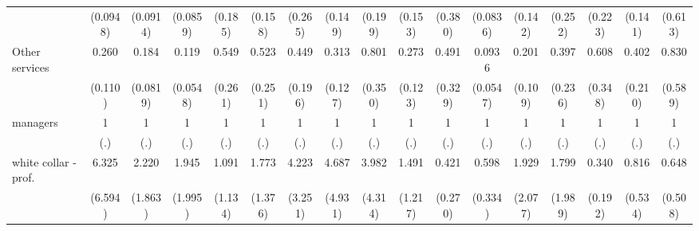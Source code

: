 {\begin{tabular}{l*{16}{c}}
                    &    (0.0948)         &    (0.0914)         &    (0.0859)         &     (0.185)         &     (0.158)         &     (0.265)         &     (0.149)         &     (0.199)         &     (0.153)         &     (0.380)         &    (0.0836)         &     (0.142)         &     (0.252)         &     (0.223)         &     (0.141)         &     (0.613)         \\
[1em]
Other services      &       0.260\sym{**} &       0.184\sym{***}&       0.119\sym{***}&       0.549         &       0.523         &       0.449         &       0.313\sym{**} &       0.801         &       0.273\sym{**} &       0.491         &      0.0936\sym{***}&       0.201\sym{**} &       0.397         &       0.608         &       0.402         &       0.830         \\
                    &     (0.110)         &    (0.0819)         &    (0.0548)         &     (0.261)         &     (0.251)         &     (0.196)         &     (0.127)         &     (0.350)         &     (0.123)         &     (0.329)         &    (0.0547)         &     (0.109)         &     (0.236)         &     (0.348)         &     (0.210)         &     (0.589)         \\
[1em]
managers            &           1         &           1         &           1         &           1         &           1         &           1         &           1         &           1         &           1         &           1         &           1         &           1         &           1         &           1         &           1         &           1         \\
                    &         (.)         &         (.)         &         (.)         &         (.)         &         (.)         &         (.)         &         (.)         &         (.)         &         (.)         &         (.)         &         (.)         &         (.)         &         (.)         &         (.)         &         (.)         &         (.)         \\
[1em]
white collar - prof.&       6.325         &       2.220         &       1.945         &       1.091         &       1.773         &       4.223         &       4.687         &       3.982         &       1.491         &       0.421         &       0.598         &       1.929         &       1.799         &       0.340         &       0.816         &       0.648         \\
                    &     (6.594)         &     (1.863)         &     (1.995)         &     (1.134)         &     (1.376)         &     (3.251)         &     (4.931)         &     (4.314)         &     (1.217)         &     (0.270)         &     (0.334)         &     (2.077)         &     (1.989)         &     (0.192)         &     (0.534)         &     (0.508)         \\

\end{tabular}}
